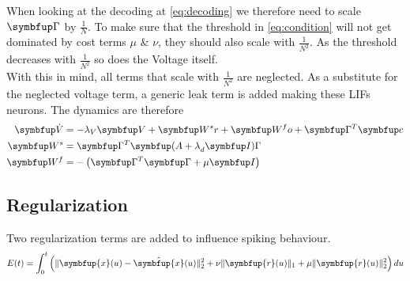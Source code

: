 When looking at the decoding at \cref{eq:decoding} we therefore need to scale $\bmu{\Gamma}$ by $\frac{1}{N}$. To make sure that the threshold in \cref{eq:condition} will not get dominated by cost terms $\mu$ \& $\nu$, they should also scale with $\frac{1}{N^2}$. As the threshold decreases with $\frac{1}{N^2}$ so does the Voltage itself.\\
With this in mind, all terms that scale with $\frac{1}{N^2}$ are neglected. As a substitute for the neglected voltage term, a generic leak term is added making these \acp{LIF} neurons. The dynamics are therefore
\begin{equation}
\begin{aligned}
	\bmu{\dot{V}} &= -\lambda_V \bmu{V} + \bmu{W^sr} + \bmu{W^fo} + \bmu{\Gamma}^T \bmu{c}\\
	\bmu{W^s} &= \bmu{\Gamma}^T\bmu{(A+\lambda}_d\bmu{I)\Gamma}\\
	\bmu{W^f} & = -\left(\bmu{\Gamma}^T\bmu{\Gamma} + \mu\bmu{I}\right)
\end{aligned}
\end{equation}









\subsection{Regularization}\label{sssection:regularization}

Two regularization terms are added to influence spiking behaviour.\\
\begin{equation}\label{eq:cost_func}
E(t)=\int_0^t \left(\|\symbfup{x}(u)-\hat{\symbfup{x}}(u)\|_2^2+\nu\|\symbfup{r}(u)\|_1+\mu\|\symbfup{r}(u)\|_2^2\right)d u
\end{equation}

